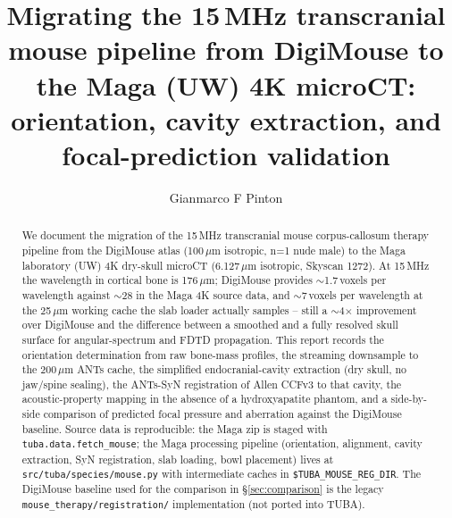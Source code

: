 \documentclass{compactarticle}
\begin{document}
\justifying
{}


\title{Migrating the 15\,MHz transcranial mouse pipeline from DigiMouse to
       the Maga (UW) 4K microCT: orientation, cavity extraction, and
       focal-prediction validation}

\author{Gianmarco F Pinton}




\begin{abstract}
We document the migration of the 15\,MHz transcranial mouse corpus-callosum
therapy pipeline from the DigiMouse atlas (100\,$\mu$m isotropic, n=1
nude male) to the Maga laboratory (UW) 4K dry-skull microCT
(6.127\,$\mu$m isotropic, Skyscan 1272). At 15\,MHz the wavelength in
cortical bone is 176\,$\mu$m; DigiMouse provides $\sim$1.7\,voxels per
wavelength against $\sim$28 in the Maga 4K source data, and
$\sim$7\,voxels per wavelength at the 25\,$\mu$m working cache the
slab loader actually samples -- still a $\sim$4$\times$ improvement
over DigiMouse and the difference between a smoothed and a fully
resolved skull surface for angular-spectrum and FDTD propagation. This report
records the orientation determination from raw bone-mass profiles,
the streaming downsample to the 200\,$\mu$m ANTs cache, the simplified
endocranial-cavity extraction (dry skull, no jaw/spine sealing), the
ANTs-SyN registration of Allen CCFv3 to that cavity, the acoustic-property
mapping in the absence of a hydroxyapatite phantom, and a side-by-side
comparison of predicted focal pressure and aberration against the
DigiMouse baseline. Source data is reproducible: the Maga zip is
staged with \texttt{tuba.data.fetch\_mouse}; the Maga processing
pipeline (orientation, alignment, cavity extraction, SyN registration,
slab loading, bowl placement) lives at \texttt{src/tuba/species/mouse.py}
with intermediate caches in \texttt{\$TUBA\_MOUSE\_REG\_DIR}. The
DigiMouse baseline used for the comparison in \S\ref{sec:comparison} is
the legacy \texttt{mouse\_therapy/registration/} implementation (not
ported into TUBA).
\end{abstract}
\end{document}
